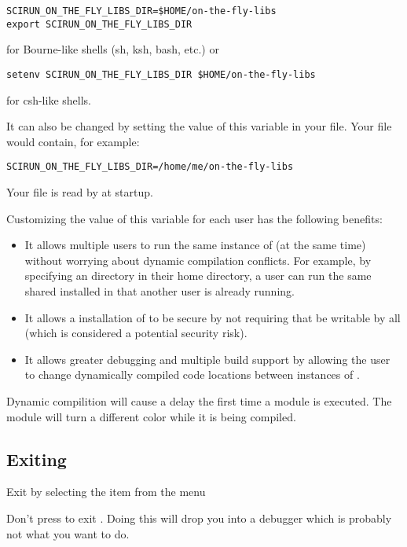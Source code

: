\begin{verbatim}
SCIRUN_ON_THE_FLY_LIBS_DIR=$HOME/on-the-fly-libs
export SCIRUN_ON_THE_FLY_LIBS_DIR
\end{verbatim}

for Bourne-like shells (sh, ksh, bash, etc.) or

\begin{verbatim}
setenv SCIRUN_ON_THE_FLY_LIBS_DIR $HOME/on-the-fly-libs
\end{verbatim}

for csh-like shells.

It can also be changed by setting the value of this variable in
your 
file. Your  file would contain, for example:

\begin{verbatim}
SCIRUN_ON_THE_FLY_LIBS_DIR=/home/me/on-the-fly-libs
\end{verbatim}

Your  file is read by \sr{} at startup.

Customizing the value of this variable for each \sr{} user has
the following benefits:

\begin{itemize}
\item It allows multiple users to run the same instance of \sr{} (at
  the same time) without worrying about dynamic compilation conflicts.
  For example, by specifying an 
  directory in their home directory, a user can run the same shared
  \sr{} installed in  that another user
  is already running.

\item It allows a  installation of \sr{}
  to be secure by not requiring that
   be writable by
  all (which is considered a potential security risk).

\item It allows greater debugging and multiple build support by
  allowing the user to change dynamically compiled code locations
  between instances of \sr{}.

\end{itemize}

Dynamic compilition will cause a delay the first time a module is
executed.  The module will turn a different color while it is being
compiled.

\subsection{Exiting \sr{}}
\label{sec:stopping}

Exit \sr{} by selecting the  item from the  menu

Don't press  to exit \sr{}.  Doing this will drop
you into a debugger which is probably not what you want to do.


